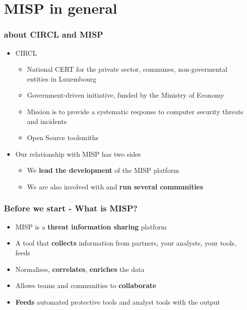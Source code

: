 
\begin{frame}[t,plain]
\titlepage
\end{frame}

\section{MISP in general}

\begin{frame}
    \frametitle{about CIRCL and MISP}
    \begin{itemize}
        \item CIRCL
        \begin{itemize}
            \item National CERT for the private sector, communes, non-govermental entities in Luxembourg
            \item Government-driven initiative, funded by the Ministry of Economy
            \item Mission is to provide a systematic response to computer security threats and incidents
            \item Open Source toolsmiths
        \end{itemize}
        \item Our relationship with MISP has two sides
        \begin{itemize}
            \item We {\bf lead the development} of the MISP platform
            \item We are also involved with and {\bf run several communities}
        \end{itemize}
    \end{itemize}
\end{frame}

\begin{frame}
\frametitle{Before we start - What is MISP?}
\begin{itemize}
       \item MISP is a {\bf threat information sharing} platform
       \item A tool that {\bf collects} information from partners, your analysts, your tools, feeds
       \item Normalises, {\bf correlates}, {\bf enriches} the data
       \item Allows teams and communities to {\bf collaborate}
       \item {\bf Feeds} automated protective tools and analyst tools with the output
\end{itemize}
\end{frame}

